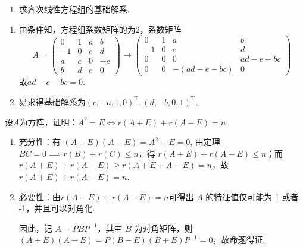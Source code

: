 \begin{exercise}
\begin{exgroup}
\begin{enumerate}
            \item 求齐次线性方程组的基础解系.
        \end{enumerate}
        \begin{answer}
            \begin{enumerate}
                \item 由条件知，方程组系数矩阵的为2，系数矩阵
                      \[ A=\begin{pmatrix}
                              0  & 1 & a & b  \\
                              -1 & 0 & c & d  \\
                              a  & c & 0 & -e \\
                              b  & d & e & 0
                          \end{pmatrix}\rightarrow
                          \begin{pmatrix}
                              0  & 1 & a          & b       \\
                              -1 & 0 & c          & d       \\
                              0  & 0 & 0          & ad-e-bc \\
                              0  & 0 & -(ad-e-bc) & 0
                          \end{pmatrix} \]
                      故$ad-e-bc=0$.

                \item 易求得基础解系为$(c,-a,1,0)^\mathrm{T},(d,-b,0,1)^\mathrm{T}$.
            \end{enumerate}
        \end{answer}
    \end{exgroup}

    \begin{exgroup}
        \item 设$A$为方阵，证明：$A^2=E \iff r(A+E)+r(A-E)=n$.
        \begin{answer}
        \begin{enumerate}
            \item 充分性：有 $(A+E)(A-E) = A^2 - E = 0$, 由定理 $BC=0 \implies r(B)+r(C) \leq n$，得 $r(A+E)+r(A-E) \leq n$；而 $r(A+E)+r(A-E) \geq r(A+E+A-E) = n$，故 $r(A+E)+r(A-E)=n$.
            \item 必要性：由$r(A+E)+r(A-E)=n$可得出 $A$ 的特征值仅可能为 1 或者 -1，并且可以对角化.

                因此，记 $A = PBP^{-1}$，其中 $B$ 为对角矩阵，则 $(A+E)(A-E)=P(B-E)(B+E)P^{-1}=0$，故命题得证.
        \end{enumerate}
        \end{answer}


\end{exgroup}
\end{exercise}
